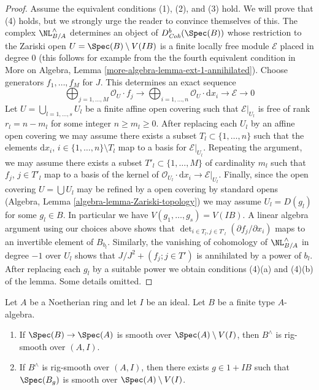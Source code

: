 \begin{proof}
\medskip\noindent
Assume the equivalent conditions (1), (2), and (3) hold. We will prove
that (4) holds, but we strongly urge the reader to convince themselves
of this. The complex $\NL_{B/A}^\wedge$ determines an object of
$D^b_{\textit{Coh}}(\Spec(B))$ whose restriction to the Zariski open
$U = \Spec(B) \setminus V(IB)$ is a finite locally free module
$\mathcal{E}$ placed in degree $0$ (this follows for example from the
the fourth equivalent condition in
More on Algebra, Lemma \ref{more-algebra-lemma-ext-1-annihilated}).
Choose generators $f_1, \ldots, f_M$ for $J$.
This determines an exact sequence
$$
\bigoplus\nolimits_{j = 1, \ldots, M} \mathcal{O}_U \cdot f_j \to
\bigoplus\nolimits_{i = 1, \ldots, n} \mathcal{O}_U \cdot \text{d}x_i \to
\mathcal{E} \to 0
$$
Let $U = \bigcup_{l = 1, \ldots, s} U_l$
be a finite affine open covering such that
$\mathcal{E}|_{U_l}$ is free of rank $r_l = n - m_l$ for some integer
$n \geq m_l \geq 0$. After replacing
each $U_l$ by an affine open covering we may assume there exists
a subset $T_l \subset \{1, \ldots, n\}$ such that the elements
$\text{d}x_i$, $i \in \{1, \ldots, n\} \setminus T_l$ map to a
basis for $\mathcal{E}|_{U_l}$. Repeating the argument, we may
assume there exists a subset $T'_l \subset \{1, \ldots, M\}$
of cardinality $m_l$ such that $f_j$, $j \in T'_l$ map to a basis
of the kernel of $\mathcal{O}_{U_l} \cdot \text{d}x_i \to
\mathcal{E}|_{U_l}$. Finally, since the open covering
$U = \bigcup U_l$ may be refined by a open covering by standard opens
(Algebra, Lemma \ref{algebra-lemma-Zariski-topology})
we may assume $U_l = D(g_l)$ for some $g_l \in B$.
In particular we have $V(g_1, \ldots, g_s) = V(IB)$.
A linear algebra argument using our choices above shows that
$\det_{i \in T_l, j \in T'_l}(\partial f_j/ \partial x_i)$
maps to an invertible element of $B_{b_l}$. Similarly, the vanishing
of cohomology of $\NL_{B/A}^\wedge$ in degree $-1$ over $U_l$ shows that
$J/J^2 + (f_j; j \in T')$ is annihilated by a power of $b_l$.
After replacing each $g_l$ by a suitable power we obtain
conditions (4)(a) and (4)(b) of the lemma. Some details omitted.
\end{proof}

\begin{lemma}
\label{lemma-rig-smooth}
Let $A$ be a Noetherian ring and let $I$ be an ideal.
Let $B$ be a finite type $A$-algebra.
\begin{enumerate}
\item If $\Spec(B) \to \Spec(A)$ is smooth over $\Spec(A) \setminus V(I)$,
then $B^\wedge$ is rig-smooth over $(A, I)$.
\item If $B^\wedge$ is rig-smooth over $(A, I)$,
then there exists $g \in 1 + IB$ such that $\Spec(B_g)$ is smooth
over $\Spec(A) \setminus V(I)$.
\end{enumerate}
\end{lemma}

